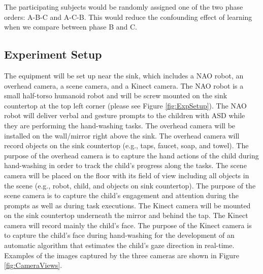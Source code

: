The participating subjects would be randomly assigned one of the two phase orders: A-B-C and A-C-B.  This would reduce the confounding effect of learning when we compare between phase B and C.

\subsection{Experiment Setup}
\label{Sec:ExpSetup}
The equipment will be set up near the sink, which includes a NAO robot, an overhead camera, a scene camera, and a Kinect camera. The NAO robot is a small half-torso humanoid robot and will be screw mounted on the sink countertop at the top left corner (please see Figure \ref{fig:ExpSetup}). The NAO robot will deliver verbal and gesture prompts to the children with ASD while they are performing the hand-washing tasks.  The overhead camera will be installed on the wall/mirror right above the sink. The overhead camera will record objects on the sink countertop (e.g., taps, faucet, soap, and towel). The purpose of the overhead camera is to capture the hand actions of the child during hand-washing in order to track the child’s progress along the tasks. The scene camera will be placed on the floor with its field of view including all objects in the scene (e.g., robot, child, and objects on sink countertop). The purpose of the scene camera is to capture the child’s engagement and attention during the prompts as well as during task executions. The Kinect camera will be mounted on the sink countertop underneath the mirror and behind the tap. The Kinect camera will record mainly the child’s face. The purpose of the Kinect camera is to capture the child’s face during hand-washing for the development of an automatic algorithm that estimates the child’s gaze direction in real-time. Examples of the images captured by the three cameras are shown in Figure \ref{fig:CameraViews}.
